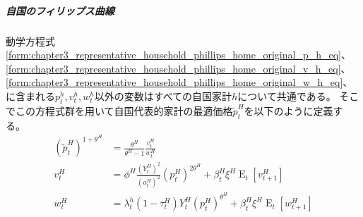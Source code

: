 \subparagraph{自国のフィリップス曲線}
\label{sec:chapter3_representative_household_phillips_home_representative_phillips}
動学方程式
\eqref{form:chapter3_representative_household_phillips_home_original_p_h_eq}、
\eqref{form:chapter3_representative_household_phillips_home_original_v_h_eq}、
\eqref{form:chapter3_representative_household_phillips_home_original_w_h_eq}、
に含まれる\(p_t^h, v_t^h, w_t^h\)以外の変数はすべての自国家計\(h\)について共通である。
そこでこの方程式群を用いて自国代表的家計の最適価格\(\widetilde{p}_t^H\)を以下のように定義する。
\begin{align}
    \label{form:chapter3_representative_household_phillips_home_representative_p_H_tilde_def}
        (\widetilde{p}_t^H)^{1+\theta^H}&=\frac{\theta^H}{\theta^H-1}\frac{v_t^H}{w_t^H} \\
    \label{form:chapter3_representative_household_phillips_home_representative_v_H_eq}
        v_t^H&=\phi^H\frac{(Y_t^H)^2}{(a_t^H)^2}(p_t^H)^{2\theta^H}+\beta_t^H\xi^H\operatorname{E}_t[v_{t+1}^H] \\
    \label{form:chapter3_representative_household_phillips_home_representative_w_H_eq}
        w_t^H&=\lambda_t^h(1-\tau_t^H)Y_t^H(p_t^H)^{\theta^H}+\beta_t^H\xi^H\operatorname{E}_t[w_{t+1}^H]
\end{align}

